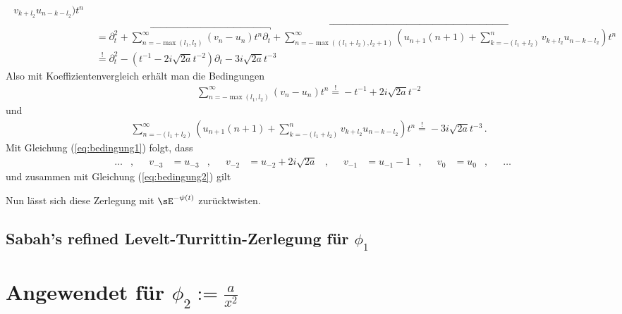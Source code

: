 \begin{try}
\begin{align*}
\begin{aligned}
{{  v_{k+l_2}u_{n-k-l_2})t^{n}
  }}
  \end{aligned}
\\&= \partial_t^2 
  + \overbracket{\sum_{n=-\max(l_1,l_2)}^\infty (v_n-u_n)t^n \partial_t}
  + \overbracket{\sum_{n=-\max((l_1+l_2),l_2+1)}^\infty
  (u_{n+1}(n+1)+\sum_{k=-(l_1+l_2)}^{n} v_{k+l_2}u_{n-k-l_2})t^n}
\\&\overset{!}{=} \partial_t^2 - (t^{-1} - 2i\sqrt{2a}t^{-2})\partial_t 
  - 3 i\sqrt{2a}t^{-3}
\end{align*}
Also mit Koeffizientenvergleich erhält man die Bedingungen
\begin{align} \label{eq:bedingung1}
\sum_{n=-\max(l_1,l_2)}^\infty (v_n-u_n)t^n
\overset{!}{=}-t^{-1}+2i\sqrt{2a}t^{-2}
\end{align}
und
\begin{align} \label{eq:bedingung2}
\sum_{n=-(l_1+l_2)}^\infty
(u_{n+1}(n+1)+\sum_{k=-(l_1+l_2)}^{n} v_{k+l_2}u_{n-k-l_2})t^n
\overset{!}{=}-3i\sqrt{2a}t^{-3} \,.
\end{align}
Mit Gleichung (\ref{eq:bedingung1}) folgt, dass
\begin{align*}
& \dots
&,&& v_{-3}&=u_{-3}
&,&& v_{-2}&=u_{-2}+2i\sqrt{2a}
&,&& v_{-1}&=u_{-1}-1
&,&& v_0&=u_0
&,&& \dots
\end{align*}
und zusammen mit Gleichung (\ref{eq:bedingung2}) gilt
\end{try}

\begin{comment}
$\cdots$
\end{comment}

Nun lässt sich diese Zerlegung mit $\sE^{-\psi(t)}$ zurücktwisten.

\subsection{Sabah's refined Levelt-Turrittin-Zerlegung für $\phi_1$}

\section{Angewendet für $\phi_2:=\frac{a}{x^2}$}

